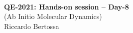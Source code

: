 \documentclass[landscape]{foils}
\begin{document}

\blue
~\\
\vspace*{4cm}
\MyLogo{~}
\vspace{5em}
\begin{center}
  {\burgundy\LARGE\bf QE-2021: Hands-on session -- Day-8}\\[2em]
  {\burgundy\LARGE (Ab Initio Molecular Dynamics)}
  ~\\[1.5em]
  \large Riccardo Bertossa
\end{center}
\end{document}
